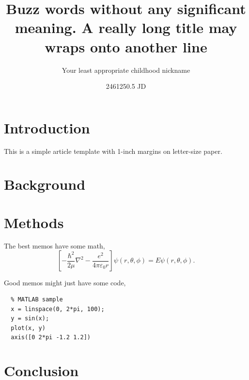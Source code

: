 \documentclass[11pt]{memo_template}
\title{Buzz words without any significant meaning.  A really long
title may wraps onto another line}
\author{Your least appropriate childhood nickname}
\date{2461250.5 JD}
\begin{document}

\clearpage
\setcounter{page}{1}

\maketitle

\section{Introduction}
This is a simple article template with 1-inch margins on letter-size paper.

\blindtext

\section{Background}
\Blindtext

\section{Methods}
\blindtext

The best memos have some math,
\begin{equation}
  \left[-\frac{\hbar^2}{2\mu}\nabla^2 - \frac{e^2}{4\pi\varepsilon_0
  r}\right]\psi(r,\theta,\phi)=E\psi(r,\theta,\phi).
\end{equation}

Good memos might just have some code,
\begin{verbatim}
  % MATLAB sample
  x = linspace(0, 2*pi, 100);
  y = sin(x);
  plot(x, y)
  axis([0 2*pi -1.2 1.2])
\end{verbatim}

\section{Conclusion}
\blindtext


\end{document}
